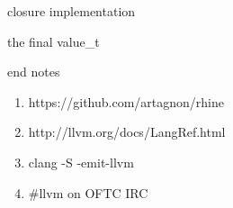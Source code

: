 \documentclass{beamer}
\begin{document}
\begin{frame}{closure implementation}
  
\end{frame}

\begin{frame}{the final value\_t}
  
\end{frame}

\begin{frame}{end notes}
  \begin{enumerate}
  \item https://github.com/artagnon/rhine
  \item http://llvm.org/docs/LangRef.html
  \item clang -S -emit-llvm
  \item \#llvm on OFTC IRC
  \end{enumerate}
\end{frame}
\end{document}
